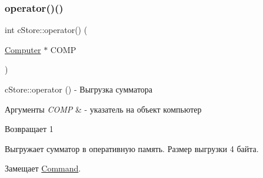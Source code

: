\subsubsection{\texorpdfstring{operator()()}{operator()()}}
{\footnotesize\ttfamily int c\+Store\+::operator() (\begin{DoxyParamCaption}\item[{\hyperlink{class_computer}{Computer} $\ast$}]{C\+O\+MP }\end{DoxyParamCaption})\hspace{0.3cm}{\ttfamily [virtual]}}



c\+Store\+::operator () -\/ Выгрузка сумматора 


\begin{DoxyParams}{Аргументы}
{\em C\+O\+MP} & -\/ указатель на объект компьютер \\
\hline
\end{DoxyParams}
\begin{DoxyReturn}{Возвращает}
1
\end{DoxyReturn}
Выгружает сумматор в оперативную память. Размер выгрузки 4 байта. 

Замещает \hyperlink{class_command_a79939b66f3de892e91d7710844294716}{Command}.


